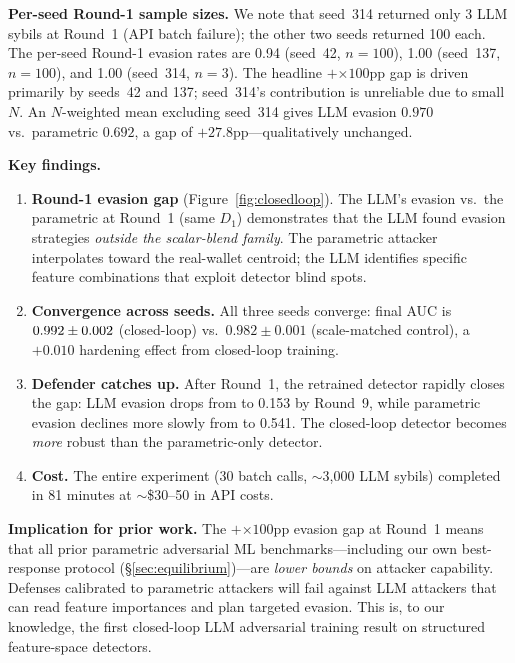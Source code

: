 \documentclass[sigconf,nonacm=false]{acmart}
\begin{document}
\noindent\textbf{Per-seed Round-1 sample sizes.}
We note that seed~314 returned only 3 LLM sybils at Round~1 (API batch failure); the other two seeds returned 100 each. The per-seed Round-1 evasion rates are 0.94 (seed~42, $n{=}100$), 1.00 (seed~137, $n{=}100$), and 1.00 (seed~314, $n{=}3$). The headline $+$\closedLoopRoundEvasionDelta{}$\times 100$pp gap is driven primarily by seeds~42 and 137; seed~314's contribution is unreliable due to small $N$. An $N$-weighted mean excluding seed~314 gives LLM evasion $0.970$ vs.\ parametric $0.692$, a gap of $+27.8$pp---qualitatively unchanged.

\noindent\textbf{Key findings.}
\begin{enumerate}
  \item \textbf{Round-1 evasion gap} (Figure~\ref{fig:closedloop}). The LLM's \closedLoopRoundLlmEvasionMean{} evasion vs.\ the parametric \closedLoopRoundParametricEvasionMean{} at Round~1 (same $D_1$) demonstrates that the LLM found evasion strategies \emph{outside the scalar-blend family}. The parametric attacker interpolates toward the real-wallet centroid; the LLM identifies specific feature combinations that exploit detector blind spots.
  \item \textbf{Convergence across seeds.} All three seeds converge: final AUC is $0.992{} \pm 0.002$ (closed-loop) vs.\ $0.982 \pm 0.001$ (scale-matched control), a $+0.010$ hardening effect from closed-loop training.
  \item \textbf{Defender catches up.} After Round~1, the retrained detector rapidly closes the gap: LLM evasion drops from \closedLoopRoundLlmEvasionMean{} to 0.153 by Round~9, while parametric evasion declines more slowly from \closedLoopRoundParametricEvasionMean{} to 0.541. The closed-loop detector becomes \emph{more} robust than the parametric-only detector.
  \item \textbf{Cost.} The entire experiment (30 batch calls, ${\sim}$3,000 LLM sybils) completed in 81 minutes at ${\sim}$\$30--50 in API costs.
\end{enumerate}

\noindent\textbf{Implication for prior work.}
The $+$\closedLoopRoundEvasionDelta{}$\times 100$pp evasion gap at Round~1 means that all prior parametric adversarial ML benchmarks---including our own best-response protocol (\S\ref{sec:equilibrium})---are \emph{lower bounds} on attacker capability.
Defenses calibrated to parametric attackers will fail against LLM attackers that can read feature importances and plan targeted evasion.
This is, to our knowledge, the first closed-loop LLM adversarial training result on structured feature-space detectors.
\end{document}
